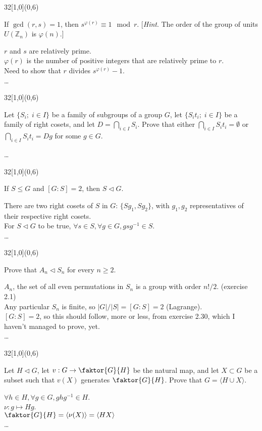 \documentclass[12pt]{article}
\newcommand{\zee}{\mathbb{Z}}
\newcommand{\normal}{\vartriangleleft}
\newenvironment{exercise}[2]{\begin{textblock}{32}[1,0](0,#2)\noindent#1\end{textblock}}{\vspace{1in}}
\begin{document}
\begin{exercise}{2.23}{6}
	{\noindent}If $\gcd(r,s)=1$, then $s^{\varphi(r)}\equiv 1 \mod r$.
	[\textit{Hint}. The order of the group of units $U(\zee_n)$ is $\varphi(n)$.]
	\bigskip

	$r$ and $s$ are relatively prime.\\
	$\varphi(r)$ is the number of positive integers that are relatively prime to $r$.\\
	Need to show that $r$ divides $s^{\varphi(r)}-1$.\\
	\dots
\end{exercise}

\begin{exercise}{2.26}{6}
	{\noindent}Let $\{S_i;\; i\in I\}$ be a family of subgroups of a group $G$, let $\{S_it_i;\; i\in I\}$ be a family of right cosets, and let $D=\bigcap_{i\in I}S_i$.  Prove that either $\bigcap_{i\in I}S_it_i=\emptyset$ or $\bigcap_{i\in I}S_it_i=Dg$ for some $g\in G$.
	\bigskip

	\dots
\end{exercise}

\begin{exercise}{2.30}{6}
	{\noindent}If $S\le G$ and $[G:S]=2$, then $S\normal G$.
	\bigskip

	There are two right cosets of $S$ in $G$: $\{Sg_1, Sg_2\}$, with $g_1, g_2$ representatives of their respective right cosets.\\
	For $S\vartriangleleft G$ to be true, $\forall s\in S, \forall g\in G, gsg^{-1}\in S$.\\
	\dots

\end{exercise}

\begin{exercise}{2.36}{6}
	{\noindent}Prove that $A_n\normal S_n$ for every $n\ge 2$.
	\bigskip

	$A_n$, the set of all even permutations in $S_n$ is a group with order $n!/2$. (exercise 2.1)\\
	Any particular $S_n$ is finite, so $|G|/|S|=[G:S]=2$ (Lagrange).\\
	$[G:S]=2$, so this should follow, more or less, from exercise 2.30, which I haven't managed to prove, yet.\\
	\dots
\end{exercise}

\newpage

\begin{exercise}{2.40}{6}
	{\noindent}Let $H\normal G$, let $v:G\to \faktor{G}{H}$ be the natural map, and let $X\subset G$ be a subset such that $v(X)$ generates $\faktor{G}{H}$. Prove that $G=\langle H\cup X\rangle$.
	\bigskip

	$\forall h\in H, \forall g\in G, ghg^{-1}\in H$.\\
	$\nu: g\mapsto Hg$.\\
	$\faktor{G}{H}=\langle\nu(X)\rangle=\langle HX\rangle$\\
	\dots
\end{exercise}
\end{document}
